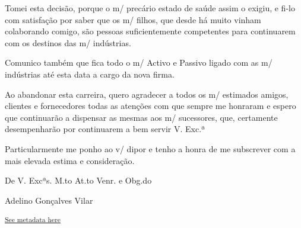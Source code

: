 \documentclass{article}
\begin{document}
\begin{center}
\begin{center}
\begin{minipage}{0.9\textwidth}
Tomei esta decisão, porque o m/ precário estado de saúde assim o exigiu,
e fi-lo com satisfação por saber que os m/ filhos, que desde há muito
vinham colaborando comigo, são pessoas suficientemente competentes para
continuarem com os destinos das m/ indústrias.

Comunico também que fica todo o m/ Activo e Passivo ligado com as m/
indústrias até esta data a cargo da nova firma.

Ao abandonar esta carreira, quero agradecer a todos os m/ estimados
amigos, clientes e fornecedores todas as atenções com que sempre me
honraram e espero que continuarão a dispensar as mesmas aos m/
sucessores, que, certamente desempenharão por continuarem a bem servir
V. Exc.ª

Particularmente me ponho ao v/ dipor e tenho a honra de me subscrever
com a mais elevada estima e consideração.

De V. Excªs. M.to At.to Venr. e Obg.do

Adelino Gonçalves Vilar

        \end{minipage}
    \end{center}
\end{center}
    
        \textsuperscript{\hyperref[table:\arabic{tablecounter}]{See metadata here}}
    


\newpage
\end{document}
